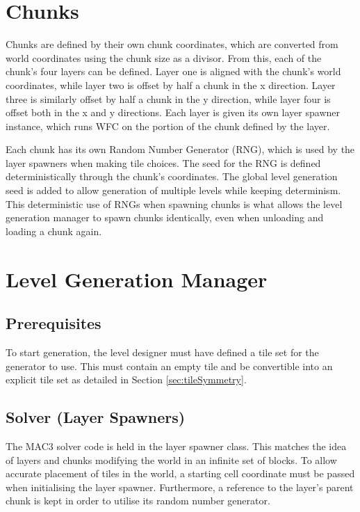 
\section{Chunks}
Chunks are defined by their own chunk coordinates, which are converted from world coordinates using the chunk size as a divisor. From this, each of the chunk's four layers can be defined. Layer one is aligned with the chunk's world coordinates, while layer two is offset by half a chunk in the x direction. Layer three is similarly offset by half a chunk in the y direction, while layer four is offset both in the x and y directions. Each layer is given its own layer spawner instance, which runs WFC on the portion of the chunk defined by the layer.


Each chunk has its own Random Number Generator (RNG), which is used by the layer spawners when making tile choices. The seed for the RNG is defined deterministically through the chunk's coordinates. The global level generation seed is added to allow generation of multiple levels while keeping determinism. This deterministic use of RNGs when spawning chunks is what allows the level generation manager to spawn chunks identically, even when unloading and loading a chunk again.

\section{Level Generation Manager}
\subsection{Prerequisites}
To start generation, the level designer must have defined a tile set for the generator to use. This must contain an empty tile and be convertible into an explicit tile set as detailed in Section \ref{sec:tileSymmetry}.

\subsection{Solver (Layer Spawners)}
The MAC3 solver code is held in the layer spawner class. This matches the idea of layers and chunks modifying the world in an infinite set of blocks. To allow accurate placement of tiles in the world, a starting cell coordinate must be passed when initialising the layer spawner. Furthermore, a reference to the layer's parent chunk is kept in order to utilise its random number generator.

